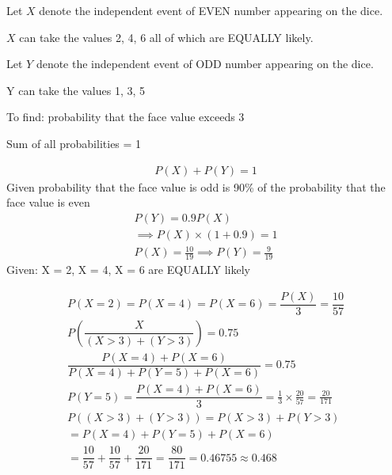\begin{description}
\item Let $X$ denote the independent event of EVEN number appearing on the dice.
\item $X$ can take the values 2, 4, 6 all of which are EQUALLY likely.
\item Let $Y$ denote the independent event of ODD number appearing on the dice. 
\item Y can take the values 1, 3, 5
\item To find: probability that the face value exceeds 3
\item Sum of all probabilities = 1
\end{description}
\begin{align}
    P(X) + P(Y) = 1
\end{align}
Given probability that the face value is odd is 90\% of the probability that the face value is even
\begin{align}
    P(Y) = 0.9P(X)\\
    \implies P(X)\times (1 + 0.9) = 1\\
    P(X) = \frac{10}{19} \implies P(Y) = \frac{9}{19}
\end{align}
Given: X = 2, X = 4, X = 6 are EQUALLY likely

\begin{align}
    P(X = 2) = P(X = 4) = P(X = 6) = \dfrac{P(X)}{3} =     \dfrac{10}{57}\\
    P\left(\dfrac{X}{(X > 3) + (Y > 3)}\right) = 0.75\\
    \dfrac{P(X = 4) + P(X = 6)}{P(X = 4) + P(Y = 5) + P(X = 6)} =     0.75\\[5pt]
    P(Y = 5) = \dfrac {P(X = 4) + P(X = 6)}{3}
    = \frac{1}{3}\times\frac{20}{57} = \frac{20}{171}\\
    P((X > 3) + (Y > 3)) = P(X > 3) + P(Y > 3)\\
    = P(X = 4) + P(Y = 5) + P(X = 6)\\
    = \dfrac{10}{57} + \dfrac{10}{57} + \dfrac{20}{171} =     \dfrac{80}{171} = 0.46755 \approx 0.468
\end{align}
